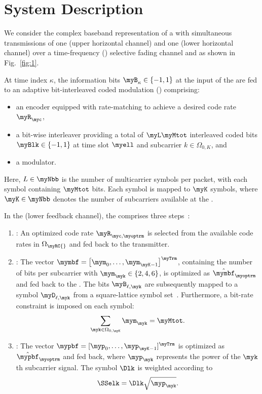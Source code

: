 \vspace{-0.5cm}
\section{\hspace{-0.5em}System Description}
\label{sec:2}

We consider the complex baseband representation of a \myUCRS{} with simultaneous transmissions of one \myPU{} (upper horizontal channel) and one \mySU{} (lower horizontal channel) over a time-frequency (\myTF{}) selective fading channel and \myTPI{} as shown in Fig.~\ref{fig:1}.

At time index $\kappa$, the information bits $\myB_{\kappa} \in \{-1, 1\}$ at the input of the \mySU{} \myTX{} are fed to an adaptive bit-interleaved coded modulation (\myABICM{}) comprising:
\begin{itemize}
    \item an \myLDPC{} encoder equipped with rate-matching to achieve a desired code rate $\myR_{\myc}$,
    \item a bit-wise interleaver providing a total of $\myL \myMtot$ interleaved coded bits $\myBlk \in \{-1, 1\}$ at time slot $\myell$ and subcarrier $k \in \Omega_{0,K}$, and
    \item a \myQAM{} modulator.
\end{itemize}

Here, $L \in \myNbb$ is the number of multicarrier symbols per \myPHY{} packet, with each symbol containing $\myMtot$ bits. Each symbol is mapped to $\myK$ \myQAM{} symbols, where $\myK \in \myNbb$ denotes the number of subcarriers available at the \mySU{} \myTX{}.

In the \myPHY{} (lower feedback channel), the \myCLO{} comprises three steps~\cite{Muttath2022_alt}:

\begin{enumerate}
    \item \textbf{\myCA{}}: An optimized code rate $\myR_{\myc,\myoptrm}$ is selected from the available code rates in $\Omega_{\myRC{}}$ and fed back to the transmitter.
    
    \item \textbf{\myBL{}}: The vector $\mymbf = \big[\mym_0, \ldots, \mym_{\myK-1} \big]^{\myTrm}$, containing the number of bits per subcarrier with $\mym_\myk \in \{2,4,6\}$, is optimized as $\hat{\mymbf}_\myoptrm$ and fed back to the \mySU{} \myTX{}. The bits $\myB_{\ell,\myk}$ are subsequently mapped to a symbol $\myD_{\ell,\myk}$ from a square-lattice \myQAM{} symbol set~\cite{Mansour2022_alt}. Furthermore, a bit-rate constraint is imposed on each symbol:
    \[
        \sum_{\myk \in \Omega_{0,\myK}} \mym_\myk = \myMtot.
    \]
    
    \item \textbf{\myPL{}}: The vector $\mypbf = [\myp_0, \ldots, \myp_{\myK-1}]^{\myTrm}$ is optimized as $\hat{\mypbf}_{\myoptrm}$ and fed back, where $\myp_\myk$ represents the power of the $\myk$th subcarrier signal. The \myQAM{} symbol $\Dlk$ is weighted according to
    \[
        \SSelk = \Dlk \sqrt{\myp_\myk}.
    \]
\end{enumerate}

